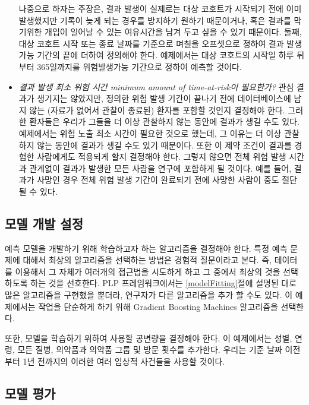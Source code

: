 \documentclass[11pt]{book}
\theoremstyle{definition}
\theoremstyle{definition}
\theoremstyle{definition}
\theoremstyle{remark}
\begin{document}
\begin{itemize}
  나중으로 하자는 주장은, 결과 발생이 실제로는 대상 코호트가 시작되기
  전에 이미 발생했지만 기록이 늦게 되는 경우를 방지하기 원하기
  때문이거나, 혹은 결과를 막기위한 개입이 일어날 수 있는 여유시간을 남겨
  두고 싶을 수 있기 때문이다. 둘째, 대상 코호트 시작 또는 종료 날짜를
  기준으로 며칠을 오프셋으로 정하여 결과 발생 가능 기간의 끝에 더하여
  정의해야 한다. 예제에서는 대상 코호트의 시작일 하루 뒤부터 365일까지를
  위험발생가능 기간으로 정하여 예측할 것이다.
\item
  \emph{결과 발생 최소 위험 시간 minimum amount of time-at-risk이
  필요한가?} 관심 결과가 생기지는 않았지만, 정의한 위험 발생 기간이
  끝나기 전에 데이터베이스에 남지 않는 (자료가 없어서 관찰이 종료된)
  환자를 포함할 것인지 결정해야 한다. 그러한 환자들은 우리가 그들을 더
  이상 관찰하지 않는 동안에 결과가 생길 수도 있다. 예제에서는 위험 노출
  최소 시간이 필요한 것으로 했는데, 그 이유는 더 이상 관찰하지 않는
  동안에 결과가 생길 수도 있기 때문이다. 또한 이 제약 조건이 결과를
  경험한 사람에게도 적용되게 할지 결정해야 한다. 그렇지 않으면 전체 위험
  발생 시간과 관계없이 결과가 발생한 모든 사람을 연구에 포함하게 될
  것이다. 예를 들어, 결과가 사망인 경우 전체 위험 발생 기간이 완료되기
  전에 사망한 사람이 중도 절단될 수 있다.
\end{itemize}

\subsection{모델 개발 설정}\label{--}

예측 모델을 개발하기 위해 학습하고자 하는 알고리즘을 결정해야 한다. 특정
예측 문제에 대해서 최상의 알고리즘을 선택하는 방법은 경험적 질문이라고
본다. 즉, 데이터를 이용해서 그 자체가 여러개의 접근법을 시도하게 하고 그
중에서 최상의 것을 선택하도록 하는 것을 선호한다. PLP 프레임워크에서는
\ref{modelFitting}절에 설명된 대로 많은 알고리즘을 구현했을 뿐더라,
연구자가 다른 알고리즘을 추가 할 수도 있다. 이 예제에서는 작업을
단순하게 하기 위해 Gradient Boosting Machines 알고리즘을 선택한다.

또한, 모델을 학습하기 위하여 사용할 공변량을 결정해야 한다. 이
예제에서는 성별, 연령, 모든 질병, 의약품과 의약품 그룹 및 방문 횟수를
추가한다. 우리는 기준 날짜 이전부터 1년 전까지의 이러한 여러 임상적
사건들을 사용할 것이다.

\subsection{모델 평가}\label{-}
\end{document}
